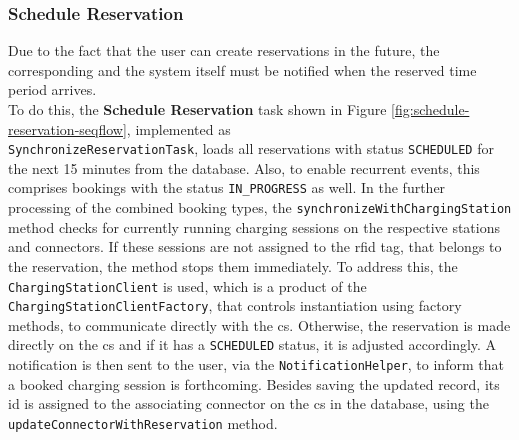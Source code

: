\subsubsection{Schedule Reservation}
\label{ch:Implementation:sec:Reservation System:ssec:Scheduling Capabilities:sssec:Schedule Reservation}

Due to the fact that the user can create reservations in the future, the corresponding  and the system itself must be notified when the reserved time period arrives. \\
To do this, the \textbf{Schedule Reservation} task shown in Figure \ref{fig:schedule-reservation-seqflow}, implemented as \\ \texttt{SynchronizeReservationTask}, loads all reservations with status \texttt{SCHEDULED} for the next 15 minutes from the database.
Also, to enable recurrent events, this comprises bookings with the status \texttt{IN\_PROGRESS} as well. 
In the further processing of the combined booking types, the \texttt{synchronizeWithChargingStation} method checks for currently running charging sessions on the respective stations and connectors. If these sessions are not assigned to the \acrshort{rfid} tag, that belongs to the reservation, the method stops them immediately.
To address this, the \texttt{ChargingStationClient} is used, which is a product of the \texttt{ChargingStationClientFactory}, that controls instantiation using factory methods, to communicate directly with the \acrshort{cs}.
Otherwise, the reservation is made directly on the \acrshort{cs} and if it has a \texttt{SCHEDULED} status, it is adjusted accordingly. A notification is then sent to the user, via the \texttt{NotificationHelper}, to inform that a booked charging session is forthcoming.
Besides saving the updated record, its \acrshort{id} is assigned to the associating connector on the \acrshort{cs} in the database, using the \texttt{updateConnectorWithReservation} method.

